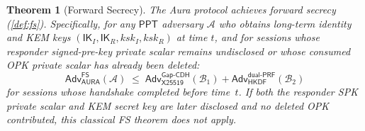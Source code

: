 \documentclass[11pt,a4paper]{article}
\newtheorem{theorem}{Theorem}[section]
\theoremstyle{definition}
\theoremstyle{remark}
\newcommand{\ppt}{\mathsf{PPT}}
\newcommand{\adv}{\mathsf{Adv}}
\newcommand{\advA}{\mathcal{A}}
\newcommand{\advB}{\mathcal{B}}
\newcommand{\HKDF}{\mathsf{HKDF}}
\renewcommand{\DH}{\mathsf{X25519}}
\newcommand{\GapCDH}{\mathsf{Gap\text{-}CDH}}
\newcommand{\dualPRF}{\mathsf{dual\text{-}PRF}}
\newcommand{\IK}{\mathsf{IK}}
\begin{document}
\begin{theorem}[Forward Secrecy]
\label{thm:fs}
The Aura protocol achieves forward secrecy (\cref{def:fs}).  Specifically,
for any $\ppt$ adversary $\advA$ who obtains long-term identity and KEM keys
$(\IK_I, \IK_R, \mathit{ksk}_I, \mathit{ksk}_R)$ at time $t$, and for sessions
whose responder signed-pre-key private scalar remains undisclosed or whose
consumed OPK private scalar has already been deleted:
\[
  \adv^{\mathsf{FS}}_{\mathsf{AURA}}(\advA)
  \;\leq\;
  \adv^{\GapCDH}_{\DH}(\advB_1)
  + \adv^{\dualPRF}_{\HKDF}(\advB_2)
\]
for sessions whose handshake completed before time~$t$. If both the responder
SPK private scalar and KEM secret key are later disclosed and no deleted OPK
contributed, this classical FS theorem does not apply.
\end{theorem}
\end{document}
